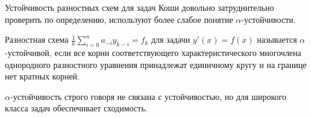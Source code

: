Устойчивость разностных схем для задач Коши довольно
затруднительно проверить по определению, используют более слабое понятие
$\alpha$-устойчивости.

\begin{definition}
  Разностная схема $\frac{1}{h}\sum\limits_{i=0}^{n}a_{-i}y_{k-i}=f_k$ для задачи
  $y'(x)=f(x)$ называется $\alpha$-устойчивой, если все корни
  соответствующего характеристического многочлена однородного
  разностного уравнения принадлежат единичному кругу и на границе
  нет кратных корней.
\end{definition}

\begin{remark}
  $\alpha$-устойчивость строго говоря не связана с устойчивостью, но
  для широкого класса задач обеспечивает сходимость.
\end{remark}
\newpage

\def\SingleImageScale {0.5}

